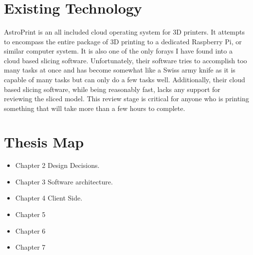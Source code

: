 \section{Existing Technology}
\paragraph{}
AstroPrint is an all included cloud operating system for 3D printers.
It attempts to encompass the entire package of 3D printing to a dedicated Raspberry Pi, or similar computer system.
It is also one of the only forays I have found into a cloud based slicing software.
Unfortunately, their software tries to accomplish too many tasks at once and has become somewhat like a Swiss army knife as it is capable of many tasks but can only do a few tasks well.
Additionally, their cloud based slicing software, while being reasonably fast, lacks any support for reviewing the sliced model.
This review stage is critical for anyone who is printing something that will take more than a few hours to complete.

\section{Thesis Map}
\paragraph{}
\begin{itemize}
\item Chapter 2 Design Decisions.
\item Chapter 3 Software architecture. 
\item Chapter 4 Client Side. 
\item Chapter 5  
\item Chapter 6  
\item Chapter 7  
\end{itemize}

